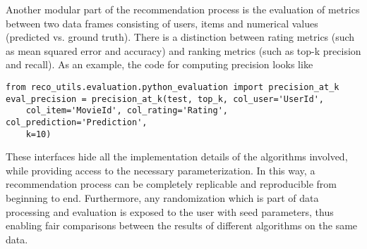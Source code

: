 Another modular part of the recommendation process is the evaluation of metrics between two data frames consisting of users, items and numerical values 
(predicted vs. ground truth). There is a distinction between rating metrics (such as mean squared error and accuracy) and ranking metrics 
(such as top-k precision and recall). As an example, the code for computing precision looks like
\begin{verbatim}
from reco_utils.evaluation.python_evaluation import precision_at_k
eval_precision = precision_at_k(test, top_k, col_user='UserId', 
    col_item='MovieId', col_rating='Rating', col_prediction='Prediction', 
    k=10)
\end{verbatim}
 
These interfaces hide all the implementation details of the algorithms involved, while providing access to the necessary parameterization.
In this way, a recommendation process can be completely replicable and reproducible from beginning to end. Furthermore, any randomization 
which is part of data processing and evaluation is exposed to the user with seed parameters, thus enabling fair comparisons between the results of different algorithms
on the same data. 

